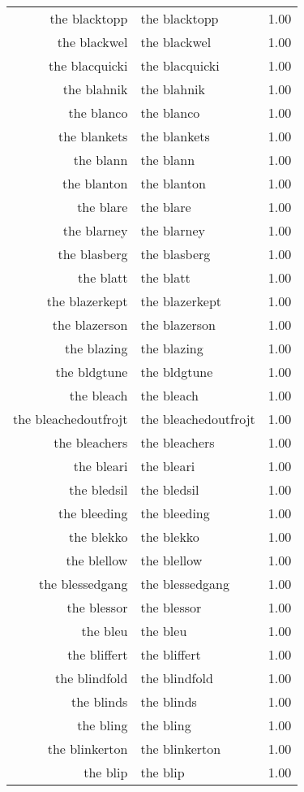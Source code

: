 \begin{table}[ht]
\begin{tabular}{rlr}
  the blacktopp & the blacktopp & 1.00 \\ 
  the blackwel & the blackwel & 1.00 \\ 
  the blacquicki & the blacquicki & 1.00 \\ 
  the blahnik & the blahnik & 1.00 \\ 
  the blanco & the blanco & 1.00 \\ 
  the blankets & the blankets & 1.00 \\ 
  the blann & the blann & 1.00 \\ 
  the blanton & the blanton & 1.00 \\ 
  the blare & the blare & 1.00 \\ 
  the blarney & the blarney & 1.00 \\ 
  the blasberg & the blasberg & 1.00 \\ 
  the blatt & the blatt & 1.00 \\ 
  the blazerkept & the blazerkept & 1.00 \\ 
  the blazerson & the blazerson & 1.00 \\ 
  the blazing & the blazing & 1.00 \\ 
  the bldgtune & the bldgtune & 1.00 \\ 
  the bleach & the bleach & 1.00 \\ 
  the bleachedoutfrojt & the bleachedoutfrojt & 1.00 \\ 
  the bleachers & the bleachers & 1.00 \\ 
  the bleari & the bleari & 1.00 \\ 
  the bledsil & the bledsil & 1.00 \\ 
  the bleeding & the bleeding & 1.00 \\ 
  the blekko & the blekko & 1.00 \\ 
  the blellow & the blellow & 1.00 \\ 
  the blessedgang & the blessedgang & 1.00 \\ 
  the blessor & the blessor & 1.00 \\ 
  the bleu & the bleu & 1.00 \\ 
  the bliffert & the bliffert & 1.00 \\ 
  the blindfold & the blindfold & 1.00 \\ 
  the blinds & the blinds & 1.00 \\ 
  the bling & the bling & 1.00 \\ 
  the blinkerton & the blinkerton & 1.00 \\ 
  the blip & the blip & 1.00 \\ 

\end{tabular}
\end{table}
